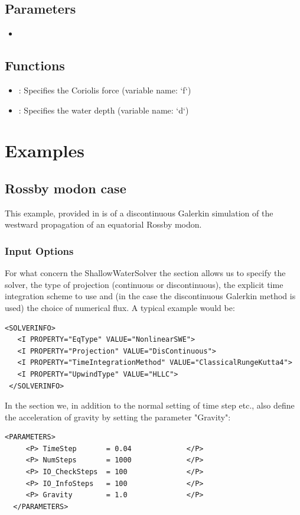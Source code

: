 \subsection{Parameters}
\begin{itemize}
\item {}
\end{itemize}

\subsection{Functions}
\begin{itemize}
\item {}: Specifies the Coriolis force (variable name: `f`)
\item {}: Specifies the water depth (variable name: `d`)
\end{itemize}

\section{Examples}
\subsection{Rossby modon case}
This example, provided in  is of a
discontinuous Galerkin simulation of the westward propagation of an equatorial
Rossby modon.


\subsubsection{Input Options}

For what concern the ShallowWaterSolver the
 section allows us to specify the solver, the type of
projection (continuous or discontinuous), the explicit time integration scheme to
use and (in the case the discontinuous Galerkin method is used) 
the choice of numerical flux. A typical example would be:
\begin{lstlisting}[style=XmlStyle]
 <SOLVERINFO>
   <I PROPERTY="EqType" VALUE="NonlinearSWE">
   <I PROPERTY="Projection" VALUE="DisContinuous">
   <I PROPERTY="TimeIntegrationMethod" VALUE="ClassicalRungeKutta4">
   <I PROPERTY="UpwindType" VALUE="HLLC">
 </SOLVERINFO>
\end{lstlisting}

In the  section we, in addition to the normal setting
of time step etc., also define the acceleration of gravity by 
setting the parameter "Gravity": 
\begin{lstlisting}[style=XmlStyle]
  <PARAMETERS>
     <P> TimeStep       = 0.04             </P>
     <P> NumSteps       = 1000             </P>
     <P> IO_CheckSteps  = 100              </P>
     <P> IO_InfoSteps   = 100              </P>
     <P> Gravity        = 1.0              </P>
  </PARAMETERS>
\end{lstlisting}

